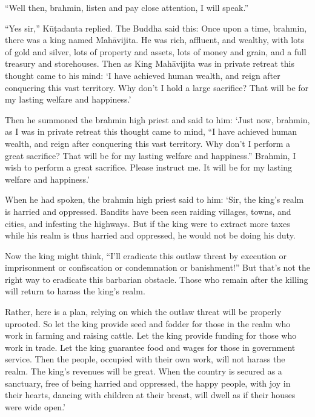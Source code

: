 \documentclass[12pt,openany]{book}%
\begin{document}
“Well then, brahmin, listen and pay close attention, I will speak.” 

“Yes sir,” \textsanskrit{Kūṭadanta} replied. The Buddha said this: Once upon a time, brahmin, there was a king named \textsanskrit{Mahāvijita}. He was rich, affluent, and wealthy, with lots of gold and silver, lots of property and assets, lots of money and grain, and a full treasury and storehouses. Then as King \textsanskrit{Mahāvijita} was in private retreat this thought came to his mind: ‘I have achieved human wealth, and reign after conquering this vast territory. Why don’t I hold a large sacrifice? That will be for my lasting welfare and happiness.’ 

Then he summoned the brahmin high priest and said to him: ‘Just now, brahmin, as I was in private retreat this thought came to mind, “I have achieved human wealth, and reign after conquering this vast territory. Why don’t I perform a great sacrifice? That will be for my lasting welfare and happiness.” Brahmin, I wish to perform a great sacrifice. Please instruct me. It will be for my lasting welfare and happiness.’ 

When he had spoken, the brahmin high priest said to him: ‘Sir, the king’s realm is harried and oppressed. Bandits have been seen raiding villages, towns, and cities, and infesting the highways. But if the king were to extract more taxes while his realm is thus harried and oppressed, he would not be doing his duty. 

Now the king might think, “I’ll eradicate this outlaw threat by execution or imprisonment or confiscation or condemnation or banishment!” But that’s not the right way to eradicate this barbarian obstacle. Those who remain after the killing will return to harass the king’s realm. 

Rather, here is a plan, relying on which the outlaw threat will be properly uprooted. So let the king provide seed and fodder for those in the realm who work in farming and raising cattle. Let the king provide funding for those who work in trade. Let the king guarantee food and wages for those in government service. Then the people, occupied with their own work, will not harass the realm. The king’s revenues will be great. When the country is secured as a sanctuary, free of being harried and oppressed, the happy people, with joy in their hearts, dancing with children at their breast, will dwell as if their houses were wide open.’ 
\end{document}
